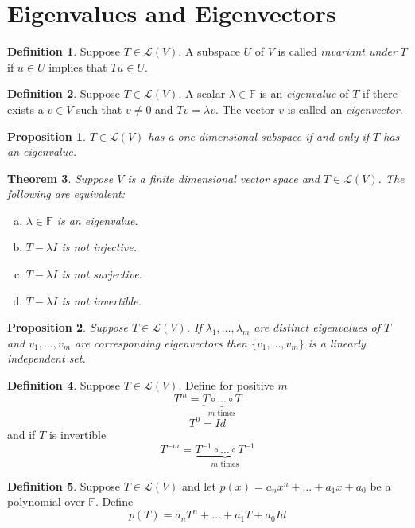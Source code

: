 \documentclass[12pt,letterpaper]{article}
\theoremstyle{plain}
\newtheorem{theorem}{Theorem}[section]
\newtheorem{proposition}{Proposition}[section]
\theoremstyle{definition}
\newtheorem{definition}[theorem]{Definition}
\numberwithin{equation}{section}
\begin{document}
\section{Eigenvalues and Eigenvectors}
\begin{definition} Suppose $T\in \mathcal{L}(V)$. A subspace $U$ of $V$ is called \emph{invariant under} $T$ if $u\in U$ implies that $Tu\in U$. 
\end{definition}
\begin{definition}Suppose $T\in \mathcal{L}(V)$. A scalar $\lambda\in \mathbb{F}$ is an \emph{eigenvalue} of $T$ if there exists a $v\in V$ such that $v\neq 0$ and $Tv=\lambda v$. The vector $v$ is called an \emph{eigenvector}.
\end{definition}
\begin{proposition}$T\in \mathcal{L}(V)$ has a one dimensional subspace if and only if $T$ has an eigenvalue. 
\end{proposition}

\begin{theorem}Suppose $V$ is a finite dimensional vector space and $T\in \mathcal{L}(V)$. The following are equivalent:
\begin{enumerate}[(a)]
\item $\lambda\in \mathbb{F}$ is an eigenvalue.
\item $T-\lambda I$ is not injective.
\item $T-\lambda I$ is not surjective.
\item $T-\lambda I$ is not invertible.
\end{enumerate}
\end{theorem}

\begin{proposition} Suppose  $T\in \mathcal{L}(V)$. If $\lambda_1, \ldots, \lambda_m$ are distinct eigenvalues of $T$ and $v_1, \ldots, v_m$ are corresponding eigenvectors then $\{v_1, \ldots, v_m\}$ is a linearly independent set. 
\end{proposition}

\begin{definition}Suppose  $T\in \mathcal{L}(V)$. Define for positive $m$
\[T^m=\underbrace{T\circ\ldots\circ T}_{m\text{ times}}\]
\[T^0=Id\]
and if $T$ is invertible
\[T^{-m}=\underbrace{T^{-1}\circ\ldots\circ T^{-1}}_{m\text{ times}}\]
\end{definition}

\begin{definition}Suppose  $T\in \mathcal{L}(V)$ and let $p(x)=a_nx^n+\ldots+a_1x+a_0$ be a polynomial over $\mathbb{F}$. Define
\[p(T)=a_nT^n+\ldots+a_1T+a_0Id\]

\end{definition}
\end{document}

